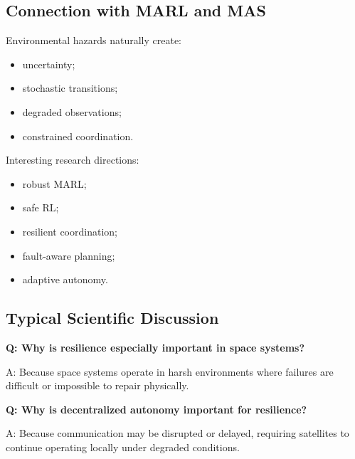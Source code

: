 \documentclass[10pt,a4paper,twocolumn]{article}
\begin{document}
\subsection{Connection with MARL and MAS}

Environmental hazards naturally create:
\begin{itemize}
    \item uncertainty;
    \item stochastic transitions;
    \item degraded observations;
    \item constrained coordination.
\end{itemize}

Interesting research directions:
\begin{itemize}
    \item robust MARL;
    \item safe RL;
    \item resilient coordination;
    \item fault-aware planning;
    \item adaptive autonomy.
\end{itemize}


\subsection{Typical Scientific Discussion}

\begin{questionbox}
    \textbf{Q: Why is resilience especially important in space systems?}

    A: Because space systems operate in harsh environments where failures are difficult or impossible to repair physically.
\end{questionbox}

\begin{questionbox}
    \textbf{Q: Why is decentralized autonomy important for resilience?}

    A: Because communication may be disrupted or delayed, requiring satellites to continue operating locally under degraded conditions.
\end{questionbox}


\end{document}
